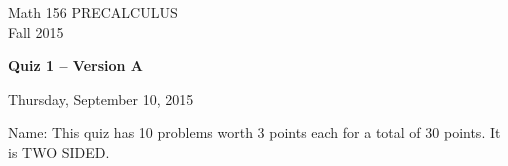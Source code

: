 \documentclass[11pt]{article}
\begin{document}
\begin{center}
\vspace{2in}

\huge{Math 156 PRECALCULUS \\
Fall 2015}

\vfill

\huge{\bf{Quiz 1 -- Version A}}\\

\vspace{0.5in}

\large{Thursday, September 10, 2015}\\

\vfill


{\huge{Name:{\underline{\hspace{2in}}}}}
\vfill
This quiz has 10 problems worth 3 points each for a total of 30 points. It is TWO SIDED. 
\vfill
\end{center}
\newpage
\restoregeometry
\end{document}

